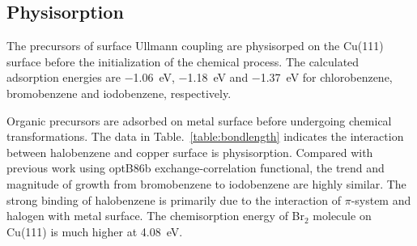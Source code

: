 \documentclass[%
 reprint,
 amsmath,amssymb,
 aps,
prb,
floatfix,
]{revtex4-2}
\newcommand{\lock}{\color{red}}
\newcommand{\lock}{\color{red}}
\begin{document}

\subsection{Physisorption}
{\lock
The precursors of surface Ullmann coupling are physisorped on the Cu(111) surface before the initialization of the chemical process. The calculated adsorption energies are \SI{-1.06}{\electronvolt}, \SI{-1.18}{\electronvolt} and \SI{-1.37}{\electronvolt} for chlorobenzene, bromobenzene and iodobenzene, respectively.
}

{\color{blue}
Organic precursors are adsorbed on metal surface before undergoing chemical transformations. 
The data in Table.~\ref{table:bondlength} indicates the interaction between halobenzene and copper surface is physisorption. Compared with previous work using optB86b exchange-correlation functional, the trend and magnitude of growth from bromobenzene to iodobenzene are highly similar. The strong binding of halobenzene is primarily due to the interaction of $\pi$-system and halogen with metal surface. The chemisorption energy of Br$_2$ molecule on Cu(111) is much higher at \SI{4.08}{\electronvolt}.




}
\end{document}
